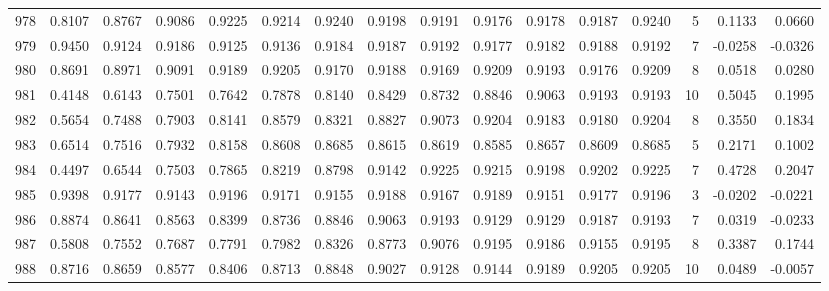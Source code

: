 \begin{tabular}{lrrrrrrrrrrrrrrr}
978 &      0.8107 &  0.8767 &  0.9086 &  0.9225 &  0.9214 &  0.9240 &  0.9198 &  0.9191 &  0.9176 &  0.9178 &   0.9187 &     0.9240 &      5 &                    0.1133 &                     0.0660 \\
979 &      0.9450 &  0.9124 &  0.9186 &  0.9125 &  0.9136 &  0.9184 &  0.9187 &  0.9192 &  0.9177 &  0.9182 &   0.9188 &     0.9192 &      7 &                   -0.0258 &                    -0.0326 \\
980 &      0.8691 &  0.8971 &  0.9091 &  0.9189 &  0.9205 &  0.9170 &  0.9188 &  0.9169 &  0.9209 &  0.9193 &   0.9176 &     0.9209 &      8 &                    0.0518 &                     0.0280 \\
981 &      0.4148 &  0.6143 &  0.7501 &  0.7642 &  0.7878 &  0.8140 &  0.8429 &  0.8732 &  0.8846 &  0.9063 &   0.9193 &     0.9193 &     10 &                    0.5045 &                     0.1995 \\
982 &      0.5654 &  0.7488 &  0.7903 &  0.8141 &  0.8579 &  0.8321 &  0.8827 &  0.9073 &  0.9204 &  0.9183 &   0.9180 &     0.9204 &      8 &                    0.3550 &                     0.1834 \\
983 &      0.6514 &  0.7516 &  0.7932 &  0.8158 &  0.8608 &  0.8685 &  0.8615 &  0.8619 &  0.8585 &  0.8657 &   0.8609 &     0.8685 &      5 &                    0.2171 &                     0.1002 \\
984 &      0.4497 &  0.6544 &  0.7503 &  0.7865 &  0.8219 &  0.8798 &  0.9142 &  0.9225 &  0.9215 &  0.9198 &   0.9202 &     0.9225 &      7 &                    0.4728 &                     0.2047 \\
985 &      0.9398 &  0.9177 &  0.9143 &  0.9196 &  0.9171 &  0.9155 &  0.9188 &  0.9167 &  0.9189 &  0.9151 &   0.9177 &     0.9196 &      3 &                   -0.0202 &                    -0.0221 \\
986 &      0.8874 &  0.8641 &  0.8563 &  0.8399 &  0.8736 &  0.8846 &  0.9063 &  0.9193 &  0.9129 &  0.9129 &   0.9187 &     0.9193 &      7 &                    0.0319 &                    -0.0233 \\
987 &      0.5808 &  0.7552 &  0.7687 &  0.7791 &  0.7982 &  0.8326 &  0.8773 &  0.9076 &  0.9195 &  0.9186 &   0.9155 &     0.9195 &      8 &                    0.3387 &                     0.1744 \\
988 &      0.8716 &  0.8659 &  0.8577 &  0.8406 &  0.8713 &  0.8848 &  0.9027 &  0.9128 &  0.9144 &  0.9189 &   0.9205 &     0.9205 &     10 &                    0.0489 &                    -0.0057 \\

\end{tabular}

